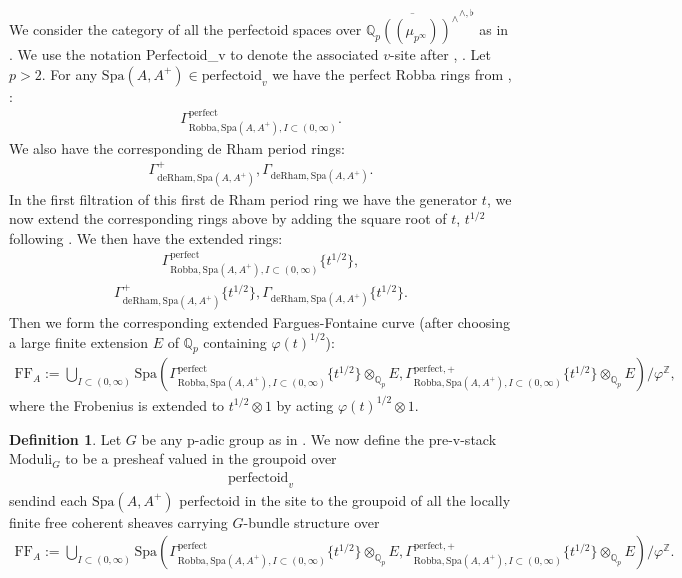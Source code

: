 \documentclass[12pt]{book}
\theoremstyle{definition}
\newtheorem{definition}{Definition}
\begin{document}
\noindent We consider the category of all the perfectoid spaces over $\overline{{\mathbb{Q}}_p((\mu_{p^\infty}))^\wedge}^{\wedge,\flat}$ as in \cite{FS}. We use the notation Perfectoid\_v to denote the associated $v$-site after \cite{FS}, \cite{Sch2}. Let $p>2$. For any $\mathrm{Spa}(A,A^+)\in \text{perfectoid}_{v}$ we have the perfect Robba rings from \cite{KL1}, \cite{KL2}:
\begin{align}
\Gamma^\text{perfect}_{\text{Robba},\mathrm{Spa}(A,A^+),I\subset (0,\infty)}.
\end{align}
We also have the corresponding de Rham period rings:
\begin{align}
\Gamma^+_{\text{deRham},\mathrm{Spa}(A,A^+)},\Gamma_{\text{deRham},\mathrm{Spa}(A,A^+)}.
\end{align}
In the first filtration of this first de Rham period ring we have the generator $t$, we now extend the corresponding rings above by adding the square root of $t$, $t^{1/2}
$ following \cite{BS}. We then have the extended rings:
\begin{align}
\Gamma^\text{perfect}_{\text{Robba},\mathrm{Spa}(A,A^+),I\subset (0,\infty)}\{t^{1/2}\},
\end{align}
\begin{align}
\Gamma^+_{\text{deRham},\mathrm{Spa}(A,A^+)}\{t^{1/2}\},\Gamma_{\text{deRham},\mathrm{Spa}(A,A^+)}\{t^{1/2}\}.
\end{align}
Then we form the corresponding extended Fargues-Fontaine curve (after choosing a large finite extension $E$ of $\mathbb{Q}_p$ containing $\varphi(t)^{1/2}$):
\begin{align}
\mathrm{FF}_A:=\bigcup_{I\subset (0,\infty)}\mathrm{Spa}(\Gamma^\text{perfect}_{\text{Robba},\mathrm{Spa}(A,A^+),I\subset (0,\infty)}\{t^{1/2}\}\otimes_{\mathbb{Q}_p}E,\Gamma^{\text{perfect},+}_{\text{Robba},\mathrm{Spa}(A,A^+),I\subset (0,\infty)}\{t^{1/2}\}\otimes_{\mathbb{Q}_p}E)/\varphi^\mathbb{Z},
\end{align}
where the Frobenius is extended to $t^{1/2}\otimes 1$ by acting $\varphi(t)^{1/2}\otimes 1$.

\begin{definition}
Let $G$ be any p-adic group as in \cite{FS}. We now define the pre-v-stack $\text{Moduli}_G$ to be a presheaf valued in the groupoid over
\begin{align}
\text{perfectoid}_{v} 
\end{align}
sendind each $\mathrm{Spa}(A,A^+)$ perfectoid in the site to the groupoid of all the locally finite free coherent sheaves carrying $G$-bundle structure over  
\begin{align}
\mathrm{FF}_A:=\bigcup_{I\subset (0,\infty)}\mathrm{Spa}(\Gamma^\text{perfect}_{\text{Robba},\mathrm{Spa}(A,A^+),I\subset (0,\infty)}\{t^{1/2}\}\otimes_{\mathbb{Q}_p}E,\Gamma^{\text{perfect},+}_{\text{Robba},\mathrm{Spa}(A,A^+),I\subset (0,\infty)}\{t^{1/2}\}\otimes_{\mathbb{Q}_p}E)/\varphi^\mathbb{Z}.
\end{align}
\end{definition}
\end{document}
